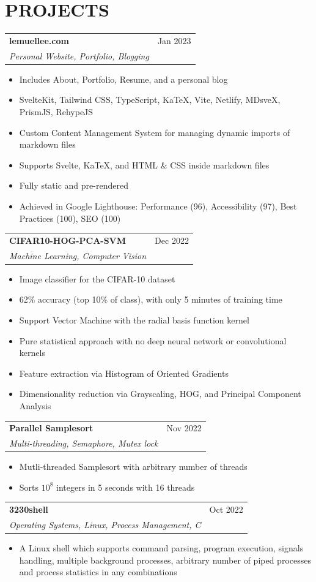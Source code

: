 \documentclass{article}
\newcommand{\jobTitle}[3]{
\vspace{0.4cm}
\begin{tabularx}{0.99\linewidth}{ X r }
    \textbf{#1} & #2\\
    \textit{#3} &
\end{tabularx}
\vspace{0.2cm}
}
\newenvironment{descitemize}
{ \begin{itemize}[leftmargin=1.4cm,,topsep=0pt]
    \setlength{\parskip}{0pt}
    \setlength{\parsep}{0pt}     }
{ \end{itemize}                  }
\begin{document}
\section{PROJECTS}

\jobTitle
{lemuellee.com}
{Jan 2023}
{Personal Website, Portfolio, Blogging}
\begin{descitemize}
    \item Includes About, Portfolio, Resume, and a personal blog
    \item SvelteKit, Tailwind CSS, TypeScript, KaTeX, Vite, Netlify, MDsveX, PrismJS, RehypeJS
    \item Custom Content Management System for managing dynamic imports of markdown files
	\item Supports Svelte, KaTeX, and HTML \& CSS inside markdown files
	\item Fully static and pre-rendered
	\item Achieved in Google Lighthouse: Performance (96), Accessibility (97), Best Practices (100), SEO (100)
\end{descitemize}

\jobTitle
{CIFAR10-HOG-PCA-SVM}
{Dec 2022}
{Machine Learning, Computer Vision}
\begin{descitemize}
    \item Image classifier for the CIFAR-10 dataset
    \item 62\% accuracy (top 10\% of class), with only 5 minutes of training time
    \item Support Vector Machine with the radial basis function kernel
    \item Pure statistical approach with no deep neural network or convolutional kernels
    \item Feature extraction via Histogram of Oriented Gradients
    \item Dimensionality reduction via Grayscaling, HOG, and Principal Component Analysis
\end{descitemize}

\jobTitle
{Parallel Samplesort}
{Nov 2022}
{Multi-threading, Semaphore, Mutex lock}
\begin{descitemize}
    \item Mutli-threaded Samplesort with arbitrary number of threads
    \item Sorts $10^8$ integers in 5 seconds with 16 threads
\end{descitemize}

\jobTitle
{3230shell}
{Oct 2022}
{Operating Systems, Linux, Process Management, C}
\begin{descitemize}
    \item A Linux shell which supports command parsing, program execution, signals handling, multiple background processes, arbitrary number of piped processes and process statistics in any combinations
\end{descitemize}
\end{document}

